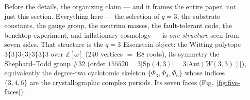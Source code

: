 \documentclass[11pt]{article}
\newcommand{\W}{W(3,3)}
\begin{document}
\label{sec:five-faces}

Before the details, the organizing claim --- and it frames the entire paper, not
just this section. Everything here --- the selection of $q=3$, the substrate
constants, the gauge group, the neutrino masses, the fault-tolerant code, the
benchtop experiment, and inflationary cosmology --- is \emph{one structure} seen from
seven sides. That structure is the $q=3$ Eisenstein object: the Witting polytope
$3\{3\}3\{3\}3\{3\}3$ over $\mathbb Z[\omega]$ ($240$ vertices $=$ E8 roots), its
symmetry the Shephard--Todd group $\#32$ (order $155520=3\lvert\mathrm{Sp}(4,3)
\rvert=3\lvert\mathrm{Aut}(\W)\rvert$), equivalently the degree-two cyclotomic
skeleton $\{\Phi_3,\Phi_4,\Phi_6\}$ whose indices $\{3,4,6\}$ are the crystallographic
complex periods. Its seven faces (Fig.~\ref{fig:five-faces}):
\end{document}
